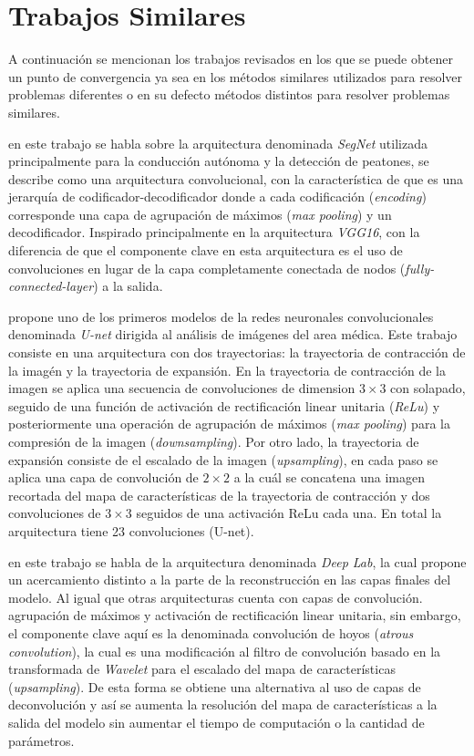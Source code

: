 \section{Trabajos Similares}

A continuación se mencionan los trabajos revisados en los que se puede obtener un punto de convergencia ya sea en los métodos similares utilizados para resolver problemas diferentes o en su defecto métodos distintos para resolver problemas similares.

\citet{DBLP:journals/corr/BadrinarayananK15} en este trabajo se habla sobre la arquitectura denominada \emph{SegNet} utilizada principalmente para la conducción autónoma y la detección de peatones, se describe como una arquitectura convolucional, con la característica de que es una jerarquía de codificador-decodificador donde a cada codificación (\emph{encoding}) corresponde una capa de agrupación de máximos (\emph{max pooling}) y un decodificador. Inspirado principalmente en la arquitectura \emph{VGG16}, con la diferencia de que el componente clave en esta arquitectura es el uso de convoluciones en lugar de la capa completamente conectada de nodos (\emph{fully-connected-layer}) a la salida.

\citet{DBLP:journals/corr/RonnebergerFB15} propone uno de los primeros modelos de la redes neuronales convolucionales denominada \emph{U-net} dirigida al análisis de imágenes del area médica. Este trabajo consiste en una arquitectura con dos trayectorias: la trayectoria de contracción de la imagén y la trayectoria de expansión. En la trayectoria de contracción de la imagen se aplica una secuencia de convoluciones de dimension $3 \times 3$ con solapado, seguido de una función de activación de rectificación linear unitaria (\emph{ReLu}) y posteriormente una operación de agrupación de máximos (\emph{max pooling}) para la compresión de la imagen (\emph{downsampling}). Por otro lado, la trayectoria de expansión consiste de el escalado de la imagen (\emph{upsampling}), en cada paso se aplica una capa de convolución de $2 \times 2$ a la cuál se concatena una imagen recortada del mapa de características de la trayectoria de contracción y dos convoluciones de $3 \times 3$ seguidos de una activación ReLu cada una. En total la arquitectura tiene 23 convoluciones (U-net).

\citet{DBLP:journals/corr/ChenPK0Y16} en este trabajo se habla de la arquitectura denominada \emph{Deep Lab}, la cual propone un acercamiento distinto a la parte de la reconstrucción en las capas finales del modelo. Al igual que otras arquitecturas cuenta con capas de convolución. agrupación de máximos y activación de rectificación linear unitaria, sin embargo, el componente clave aquí es la denominada convolución de hoyos (\emph{atrous convolution}), la cual es una modificación al filtro de convolución basado en la transformada de \emph{Wavelet} para el escalado del mapa de características (\emph{upsampling}). De esta forma se obtiene una alternativa al uso de capas de deconvolución y así se aumenta la resolución del mapa de características a la salida del modelo sin aumentar el tiempo de computación o la cantidad de parámetros.

